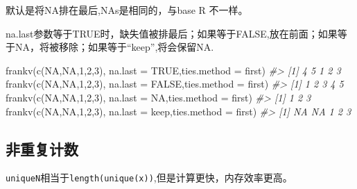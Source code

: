 \documentclass[
]{book}
\newenvironment{Shaded}{\begin{snugshade}}{\end{snugshade}}
\newcommand{\AttributeTok}[1]{\textcolor[rgb]{0.77,0.63,0.00}{#1}}
\newcommand{\CommentTok}[1]{\textcolor[rgb]{0.56,0.35,0.01}{\textit{#1}}}
\newcommand{\ConstantTok}[1]{\textcolor[rgb]{0.00,0.00,0.00}{#1}}
\newcommand{\DecValTok}[1]{\textcolor[rgb]{0.00,0.00,0.81}{#1}}
\newcommand{\FunctionTok}[1]{\textcolor[rgb]{0.00,0.00,0.00}{#1}}
\newcommand{\NormalTok}[1]{#1}
\newcommand{\StringTok}[1]{\textcolor[rgb]{0.31,0.60,0.02}{#1}}
\begin{document}
默认是将NA排在最后,NAs是相同的，与base R 不一样。

na.last参数等于TRUE时，缺失值被排最后；如果等于FALSE,放在前面；如果等于NA，将被移除；如果等于``keep'',将会保留NA.

\begin{Shaded}
\begin{Highlighting}[]
\FunctionTok{frankv}\NormalTok{(}\FunctionTok{c}\NormalTok{(}\ConstantTok{NA}\NormalTok{,}\ConstantTok{NA}\NormalTok{,}\DecValTok{1}\NormalTok{,}\DecValTok{2}\NormalTok{,}\DecValTok{3}\NormalTok{), }\AttributeTok{na.last =} \ConstantTok{TRUE}\NormalTok{,}\AttributeTok{ties.method =} \StringTok{\textquotesingle{}first\textquotesingle{}}\NormalTok{)}
\CommentTok{\#\textgreater{} [1] 4 5 1 2 3}
\FunctionTok{frankv}\NormalTok{(}\FunctionTok{c}\NormalTok{(}\ConstantTok{NA}\NormalTok{,}\ConstantTok{NA}\NormalTok{,}\DecValTok{1}\NormalTok{,}\DecValTok{2}\NormalTok{,}\DecValTok{3}\NormalTok{), }\AttributeTok{na.last =} \ConstantTok{FALSE}\NormalTok{,}\AttributeTok{ties.method =} \StringTok{\textquotesingle{}first\textquotesingle{}}\NormalTok{)}
\CommentTok{\#\textgreater{} [1] 1 2 3 4 5}
\FunctionTok{frankv}\NormalTok{(}\FunctionTok{c}\NormalTok{(}\ConstantTok{NA}\NormalTok{,}\ConstantTok{NA}\NormalTok{,}\DecValTok{1}\NormalTok{,}\DecValTok{2}\NormalTok{,}\DecValTok{3}\NormalTok{), }\AttributeTok{na.last =} \ConstantTok{NA}\NormalTok{,}\AttributeTok{ties.method =} \StringTok{\textquotesingle{}first\textquotesingle{}}\NormalTok{)}
\CommentTok{\#\textgreater{} [1] 1 2 3}
\FunctionTok{frankv}\NormalTok{(}\FunctionTok{c}\NormalTok{(}\ConstantTok{NA}\NormalTok{,}\ConstantTok{NA}\NormalTok{,}\DecValTok{1}\NormalTok{,}\DecValTok{2}\NormalTok{,}\DecValTok{3}\NormalTok{), }\AttributeTok{na.last =} \StringTok{\textquotesingle{}keep\textquotesingle{}}\NormalTok{,}\AttributeTok{ties.method =} \StringTok{\textquotesingle{}first\textquotesingle{}}\NormalTok{)}
\CommentTok{\#\textgreater{} [1] NA NA  1  2  3}
\end{Highlighting}
\end{Shaded}

\hypertarget{ux975eux91cdux590dux8ba1ux6570}{%
\subsection{非重复计数}\label{ux975eux91cdux590dux8ba1ux6570}}

\texttt{uniqueN}相当于\texttt{length(unique(x))},但是计算更快，内存效率更高。
\end{document}
